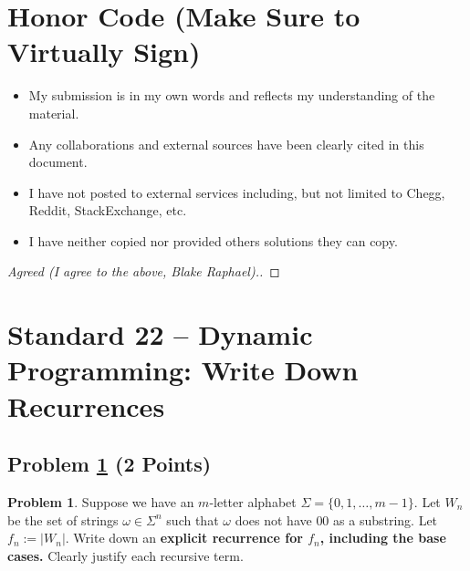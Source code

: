 \documentclass[11pt]{article}
\theoremstyle{definition}
\theoremstyle{definition}
\newtheorem{required}{Problem}
\theoremstyle{definition}
\begin{document}
\section{Honor Code (Make Sure to Virtually Sign)} \label{HonorCode}

\begin{itemize}
\item My submission is in my own words and reflects my understanding of the material.
\item Any collaborations and external sources have been clearly cited in this document.
\item I have not posted to external services including, but not limited to Chegg, Reddit, StackExchange, etc.
\item I have neither copied nor provided others solutions they can copy.
\end{itemize}


\begin{proof}[Agreed (I agree to the above, Blake Raphael).]
\end{proof}
\newpage
\section{Standard 22 -- Dynamic Programming: Write Down Recurrences}

\subsection{Problem \ref{DP1} (2 Points)}
\begin{required} \label{DP1}
Suppose we have an $m$-letter alphabet $\Sigma = \{0, 1, \ldots, m-1\}$. Let $W_{n}$ be the set of strings $\omega \in \Sigma^{n}$ such that $\omega$ does not have $00$ as a substring. Let $f_{n} := |W_{n}|$. Write down an \textbf{explicit recurrence for $f_{n}$, including the base cases.} Clearly justify each recursive term.
\end{required}
    
\end{document}
